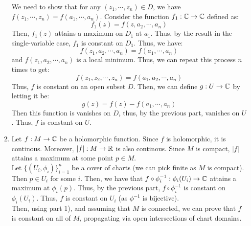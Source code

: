 \documentclass[12pt]{article}
\begin{document}
\begin{solu}
\begin{enumerate}
        We need to show that for any $(z_1, \cdots, z_n) \in D$, we have $f(z_1, \cdots, z_n) = f(a_1, \cdots, a_n)$. \bbni
        Consider the function $f_1: \mathbb C \to \mathbb C$ defined as:
        \[ f_1(z) = f(z, a_2, \cdots, a_n)\]
        Then, $f_1(z)$ attains a maximum on $D_1$ at $a_1$. Thus, by the result in the single-variable case, $f_1$ is constant on $D_1$. Thus, we have: 
        \[f(z_1, a_2, \cdots, a_n) = f(a_1, \cdots, a_n)\]
        and $f(z_1, a_2, \cdots, a_n)$ is a local minimum. Thus, we can repeat this process $n$ times to get:
        \[f(z_1, z_2, \cdots, z_n) = f(a_1, a_2, \cdots, a_n)\]
        Thus, $f$ is constant on an open subset $D$. Then, we can define $g: U \to \mathbb C$ by letting it be:
        \[g(z) = f(z)-f(a_1, \cdots, a_n)\]
        Then this function is vanishes on $D$, thus, by the previous part, vanishes on $U$. Thus, $f$ is constant on $U$. 
        \item Let $f: M \to \mathbb C$ be a holomorphic function. Since $f$ is holomorphic, it is continous. Moreover, $|f|: M \to \mathbb R$ is also continous. Since $M$ is compact, $|f|$ attains a maximum at some point $p \in M$. \\
        Let $\{(U_i, \phi_i)\}_{i=1}^n$ be a cover of charts (we can pick finite as $M$ is compact). Then $p \in U_i$ for some $i$. Then, we have that $f \circ \phi_i^{-1}: \phi_i(U_i) \to \mathbb C$ attains a maximum at $\phi_i(p)$. Thus, by the previous part, $f \circ \phi_i^{-1}$ is constant on $\phi_i(U_i)$. Thus, $f$ is constant on $U_i$ (as $\phi^{-1}$ is bijective). \\
        Then, using part 1), and assuming that $M$ is connected, we can prove that $f$ is constant on all of $M$, propagating via open intersections of chart domains.
    \end{enumerate}
\end{solu}
\newpage
\end{document}
